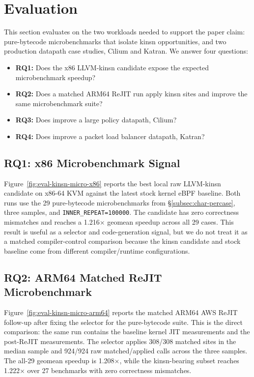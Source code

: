 \section{Evaluation}
\label{sec:eval}

This section evaluates \lang on the two workloads needed to support the paper
claim: pure-bytecode microbenchmarks that isolate kinsn opportunities, and two
production datapath case studies, Cilium and Katran. We answer four questions:
\begin{itemize}
\item \textbf{RQ1:} Does the x86 LLVM-kinsn candidate expose the expected microbenchmark speedup?
\item \textbf{RQ2:} Does a matched ARM64 ReJIT run apply kinsn sites and improve the same microbenchmark suite?
\item \textbf{RQ3:} Does \lang improve a large policy datapath, Cilium?
\item \textbf{RQ4:} Does \lang improve a packet load balancer datapath, Katran?
\end{itemize}

\subsection{RQ1: x86 Microbenchmark Signal}
\label{subsec:eval-x86-micro}

Figure~\ref{fig:eval-kinsn-micro-x86} reports the best local raw LLVM-kinsn
candidate on x86-64 KVM against the latest stock kernel eBPF baseline. Both
runs use the 29 pure-bytecode microbenchmarks from \S\ref{subsec:char-percase},
three samples, and \texttt{INNER\_REPEAT=100000}. The candidate has zero
correctness mismatches and reaches a 1.216$\times$ geomean speedup across all
29 cases. This result is useful as a selector and code-generation signal, but
we do not treat it as a matched compiler-control comparison because the kinsn
candidate and stock baseline come from different compiler/runtime
configurations.



\subsection{RQ2: ARM64 Matched ReJIT Microbenchmark}
\label{subsec:eval-arm64-micro}

Figure~\ref{fig:eval-kinsn-micro-arm64} reports the matched ARM64 AWS ReJIT
follow-up after fixing the selector for the pure-bytecode suite. This is the
direct comparison: the same run
contains the baseline kernel JIT measurements and the post-ReJIT measurements.
The selector applies 308/308 matched sites in the median sample and 924/924
raw matched/applied calls across the three samples. The all-29 geomean speedup
is 1.208$\times$, while the kinsn-bearing subset reaches 1.222$\times$ over
27 benchmarks with zero correctness mismatches.

